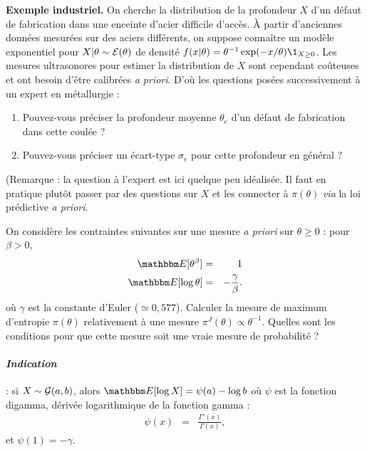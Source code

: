 \if{} \vspace{1cm} 
\fi
\vspace{0.5cm}

\begin{exec}{\bf Exemple industriel.}
On cherche la distribution de la profondeur  $X$ d'un défaut de fabrication dans une enceinte d'acier difficile d'accès. \`A partir d'anciennes données  mesurées sur des aciers différents, on suppose connaître un modèle exponentiel pour $X|\theta\sim {\cal{E}}(\theta)$ de densité $f(x|\theta)=\theta^{-1} \exp(-x/\theta)\1_{X\geq 0}$. Les mesures ultrasonores pour estimer la distribution de $X$ sont cependant coûteuses et ont besoin d'être calibrées {\it a priori}. D'où les questions posées successivement à un expert en métallurgie :
\begin{enumerate}
    \item Pouvez-vous préciser la profondeur moyenne $\theta_e$ d'un défaut de fabrication dans cette coulée ?
    \item Pouvez-vous préciser un écart-type $\sigma_e$ pour cette profondeur en général ? 
\end{enumerate}
(Remarque : la question à l'expert est ici quelque peu idéalisée. Il faut en pratique plutôt passer par des questions sur $X$ et les connecter à $\pi(\theta)$ {\it via} la loi prédictive {\it a priori}.
\end{exec}

\if{} \vspace{1cm} 
\fi
\vspace{0.5cm}


\begin{exec}
On considère les contraintes suivantes sur une mesure {\it a priori} sur $\theta\geq 0$ : pour $\beta>0$, 
\begin{eqnarray}
\E[\theta^{\beta}] & = & 1 \label{constrainte1toto} \\
\E[\log \theta] & = & -\frac{\gamma}{\beta}. \label{constrainte2toto}
\end{eqnarray}
où $\gamma$ est la constante d'Euler ($\simeq 0,577$).
Calculer la mesure de maximum d'entropie $\pi(\theta)$ relativement à une mesure $\pi^J(\theta)\propto \theta^{-1}$. Quelles sont les conditions pour que cette mesure soit une vraie mesure de probabilité ? \\

\paragraph{\it Indication} : si $X\sim {\cal{G}}(a,b)$, alors $\E[\log X]=\psi(a)-\log b$ où $\psi$ est la fonction digamma, dérivée logarithmique de la fonction gamma :  
\begin{eqnarray*}
\psi(x) & = & \frac{\Gamma'(x)}{\Gamma(x)},
\end{eqnarray*}
et $\psi(1)=-\gamma$. 
\end{exec}

